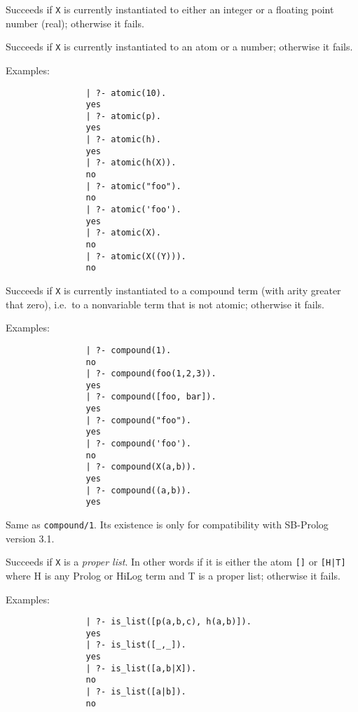 \begin{description}
    Succeeds if {\tt X} is currently instantiated to either an integer or 
    a floating point number (real); otherwise it fails.

    Succeeds if {\tt X} is currently instantiated to an atom or a number;
    otherwise it fails.

    Examples:
    {\footnotesize
     \begin{verbatim}
                | ?- atomic(10).
                yes
                | ?- atomic(p).
                yes
                | ?- atomic(h).
                yes
                | ?- atomic(h(X)).
                no
                | ?- atomic("foo").
                no
                | ?- atomic('foo').
                yes
                | ?- atomic(X).
                no
                | ?- atomic(X((Y))).
                no
     \end{verbatim}}

    Succeeds if {\tt X} is currently instantiated to a compound term (with 
    arity greater that zero), i.e.\ to a nonvariable term that is not atomic;
    otherwise it fails.

    Examples:
    {\footnotesize
     \begin{verbatim}
                | ?- compound(1).
                no
                | ?- compound(foo(1,2,3)).
                yes
                | ?- compound([foo, bar]).
                yes
                | ?- compound("foo").
                yes
                | ?- compound('foo').
                no
                | ?- compound(X(a,b)).
                yes
                | ?- compound((a,b)).
                yes	
     \end{verbatim}}

    Same as {\tt compound/1}\@. Its existence is only for compatibility 
    with SB-Prolog version 3.1.

    Succeeds if {\tt X} is a {\em proper list}. In other words if it is 
    either the atom {\tt []} or {\tt [H|T]} where H is any Prolog or HiLog
    term and T is a proper list; otherwise it fails.

    Examples:
    {\footnotesize
     \begin{verbatim}
                | ?- is_list([p(a,b,c), h(a,b)]).
                yes
                | ?- is_list([_,_]).
                yes
                | ?- is_list([a,b|X]).
                no
                | ?- is_list([a|b]).
                no
     \end{verbatim}}


\end{description}
